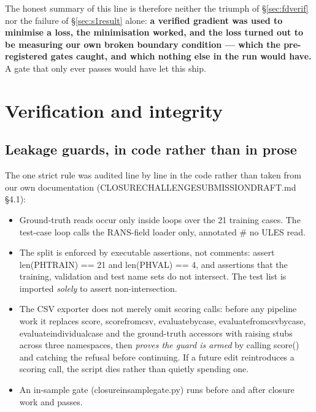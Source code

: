 \documentclass[11pt,a4paper]{article}
\newcommand{\breakus}{\textunderscore\allowbreak}
\newcommand{\code}[1]{{\small\ttfamily\let\_\breakus #1}}
\newcommand{\artifact}[1]{{\footnotesize\ttfamily\let\_\breakus #1}}
\begin{document}
\noindent The honest summary of this line is therefore neither the triumph of
\S\ref{sec:fdverif} nor the failure of \S\ref{sec:s1result} alone: \textbf{a verified
gradient was used to minimise a loss, the minimisation worked, and the loss turned out to
be measuring our own broken boundary condition --- which the pre-registered gates caught,
and which nothing else in the run would have.} A gate that only ever passes would have let
this ship.

\section{Verification and integrity}
\label{sec:integrity}

\subsection{Leakage guards, in code rather than in prose}

The one strict rule was audited line by line in the code rather than taken from our own
documentation (\artifact{CLOSURE\_CHALLENGE\_SUBMISSION\_DRAFT.md} \S4.1):

\begin{itemize}
\item Ground-truth reads occur only inside loops over the 21 training cases. The test-case
  loop calls the RANS-field loader only, annotated \code{\# no U\_LES read}.
\item The split is enforced by executable assertions, not comments:
  \code{assert len(\_PH\_TRAIN) == 21 and len(\_PH\_VAL) == 4}, and assertions that the
  training, validation and test name sets do not intersect. The test list is imported
  \emph{solely} to assert non-intersection.
\item The CSV exporter does not merely omit scoring calls: before any pipeline work it
  replaces \code{score}, \code{score\_from\_csv}, \code{evaluate\_by\_case},
  \code{evaluate\_from\_csv\_by\_case}, \code{evaluate\_individual\_case} and the
  ground-truth accessors with raising stubs across three namespaces, then \emph{proves the
  guard is armed} by calling \code{score()} and catching the refusal before continuing. If
  a future edit reintroduces a scoring call, the script dies rather than quietly spending
  one.
\item An in-sample gate (\code{closure\_in\_sample\_gate.py}) runs before and after
  closure work and passes.
\end{itemize}
\end{document}
